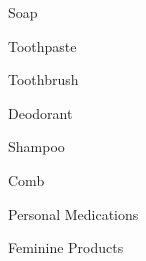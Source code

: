 \documentclass{article}
\begin{document}
{\begin{multicols*}{3}


      \begin{packlist}
        \item Soap
        \item Toothpaste
        \item Toothbrush
        \item Deodorant
      \end{packlist}


      \begin{packlist}
        \item Shampoo
        \item Comb
        \item Personal Medications
        \item Feminine Products
      \end{packlist}

    \end{multicols*}
  }
\end{document}
